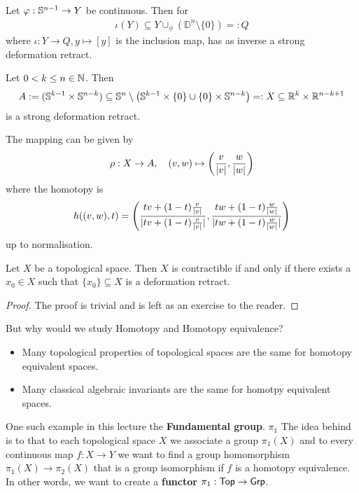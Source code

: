 \begin{ex}[]
Let $\varphi: \mathbb{S}^{n-1} \to Y$ be continuous. Then for
\begin{align*}
  \iota(Y) \subseteq Y \cup_{\phi} (\mathbb{D}^{n} \setminus \{0\}) =: Q
\end{align*}
where $\iota:Y \to Q, y \mapsto [y]$ is the inclusion map, has as inverse a strong deformation retract.

Let $0 < k \leq n \in \mathbb{N}$. Then
\begin{align*}
  A := (\mathbb{S}^{k-1} \times \mathbb{S}^{n-k}) \subseteq \mathbb{S}^{n} \setminus \left(
    \mathbb{S}^{k-1} \times \{0\} \cup \{0\} \times \mathbb{S}^{n-k}
  \right) =: X \subseteq \mathbb{R}^{k} \times \mathbb{R}^{n-k+1}
\end{align*}
is a strong deformation retract.

The mapping can be given by
\begin{align*}
  \rho: X \to  A, \quad (v,w) \mapsto  \left(
    \frac{v}{\vert v\vert}, \frac{w}{\vert w\vert}
  \right)
\end{align*}
where the homotopy is 
\begin{align*}
  h((v,w),t) = \left(
    \frac{tv + (1-t) \frac{v}{\vert v\vert}}{\vert tv + (1-t)\frac{v}{\vert v\vert}\vert},
    \frac{tw + (1-t) \frac{w}{\vert w\vert}}{\vert tw + (1-t) \frac{w}{\vert w\vert}\vert}
  \right)
\end{align*}
up to normalisation.
\end{ex}


\begin{lem}[]\label{lem:w5-2}
Let $X$ be a topological space. Then $X$ is contractible if and only if there exists a $x_0 \in X$ such that $\{x_0\} \subseteq X$ is a deformation retract.
\end{lem}
\begin{proof}
The proof is trivial and is left as an exercise to the reader.
\end{proof}


But why would we study Homotopy and Homotopy equivalence?
\begin{itemize}
  \item Many topological properties of topological spaces are the same for homotopy equivalent spaces.
  \item Many classical algebraic invariants are the same for homotpy equivalent spaces. 
\end{itemize}
One such example in this lecture the \textbf{Fundamental group}. $\pi_1$
The idea behind is to that to each topological space $X$ we associate a group $\pi_1(X)$ and to every continuous map $f: X \to Y$ we want to find a group homomorphism $\pi_1(X) \to \pi_2(X)$ that is a group isomorphism if $f$ is a homotopy equivalence.
In other words, we want to create a \textbf{functor} $\pi_1: \text{\sffamily Top} \to \text{\sffamily Grp}$.

